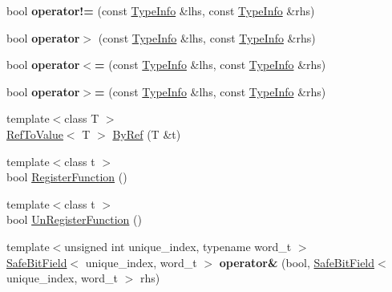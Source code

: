 \begin{DoxyCompactItemize}
\item 
\hypertarget{namespaceLoki_a004b71cc741a357d9a4edc0fef092db0}{}bool {\bfseries operator!=} (const \hyperlink{classLoki_1_1TypeInfo}{Type\+Info} \&lhs, const \hyperlink{classLoki_1_1TypeInfo}{Type\+Info} \&rhs)\label{namespaceLoki_a004b71cc741a357d9a4edc0fef092db0}

\item 
\hypertarget{namespaceLoki_a2c41b83b8d4a876a601a7923ca4f7ff8}{}bool {\bfseries operator$>$} (const \hyperlink{classLoki_1_1TypeInfo}{Type\+Info} \&lhs, const \hyperlink{classLoki_1_1TypeInfo}{Type\+Info} \&rhs)\label{namespaceLoki_a2c41b83b8d4a876a601a7923ca4f7ff8}

\item 
\hypertarget{namespaceLoki_a488df1207fa046e010e3238d968fee3b}{}bool {\bfseries operator$<$=} (const \hyperlink{classLoki_1_1TypeInfo}{Type\+Info} \&lhs, const \hyperlink{classLoki_1_1TypeInfo}{Type\+Info} \&rhs)\label{namespaceLoki_a488df1207fa046e010e3238d968fee3b}

\item 
\hypertarget{namespaceLoki_a7f89ee1c7d6da61b1eaf3dd4f8a18f92}{}bool {\bfseries operator$>$=} (const \hyperlink{classLoki_1_1TypeInfo}{Type\+Info} \&lhs, const \hyperlink{classLoki_1_1TypeInfo}{Type\+Info} \&rhs)\label{namespaceLoki_a7f89ee1c7d6da61b1eaf3dd4f8a18f92}

\item 
{\footnotesize template$<$class T $>$ }\\\hyperlink{classLoki_1_1RefToValue}{Ref\+To\+Value}$<$ T $>$ \hyperlink{group__ExceptionGroup_ga0a94ba0342e6abcdb8f9b32ed5ad7e3d}{By\+Ref} (T \&t)
\item 
{\footnotesize template$<$class t $>$ }\\bool \hyperlink{group__RegisterGroup_ga801c6be20180074d02fcc0c3fc4909bd}{Register\+Function} ()
\item 
{\footnotesize template$<$class t $>$ }\\bool \hyperlink{group__RegisterGroup_gacf54fb9d602c1d1e05b3602333847ebf}{Un\+Register\+Function} ()
\item 
\hypertarget{namespaceLoki_a6114e772c98115e13e39f845b85702b8}{}{\footnotesize template$<$unsigned int unique\+\_\+index, typename word\+\_\+t $>$ }\\\hyperlink{classLoki_1_1SafeBitField}{Safe\+Bit\+Field}$<$ unique\+\_\+index, word\+\_\+t $>$ {\bfseries operator\&} (bool, \hyperlink{classLoki_1_1SafeBitField}{Safe\+Bit\+Field}$<$ unique\+\_\+index, word\+\_\+t $>$ rhs)\label{namespaceLoki_a6114e772c98115e13e39f845b85702b8}


\end{DoxyCompactItemize}
